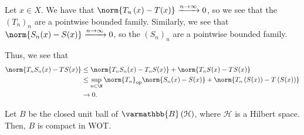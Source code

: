 \documentclass[10pt]{mypackage}
\renewcommand*{\mathbb}[1]{\varmathbb{#1}}
\newcommand{\B}{\mathbb{B}}
\begin{document}
\begin{solution}
  Let $x\in X$. We have that $\norm{T_n\left(x\right)-T(x)}\xrightarrow{n\rightarrow\infty}0$, so we see that the $\left(T_n\right)_n$ are a pointwise bounded family. Similarly, we see that $\norm{S_n(x) - S(x)}\xrightarrow{n\rightarrow\infty}0$, so the $\left(S_n\right)_n$ are a pointwise bounded family.\newline

  Thus, we see that
  \begin{align*}
    \norm{T_nS_n(x) - TS(x)} &\leq \norm{T_nS_n(x) - T_nS(x)} + \norm{T_nS(x) - TS(x)}\\
                             &\leq \sup_{n\in \N}\norm{T_n}_{\text{op}}\norm{S_n(x) - S(x)} + \norm{T_n\left(S(x)\right) - T\left(S(x)\right)}\\
                             &\rightarrow 0.
  \end{align*}
  
\end{solution}
\begin{theorem}
  Let $B$ be the closed unit ball of $\B\left(\mathcal{H}\right)$, where $\mathcal{H}$ is a Hilbert space. Then, $B$ is compact in WOT.
\end{theorem}
\end{document}
